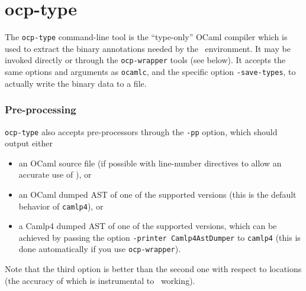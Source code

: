
\section{ocp-type}

The \verb!ocp-type! command-line tool is the ``type-only'' OCaml compiler
which is used to extract the binary annotations needed by the
\typerex\ environment. It may be invoked directly or through the
\verb!ocp-wrapper! tools (see below). It accepts the same options and
arguments as \verb!ocamlc!, and the specific option
\verb!-save-types!, to actually write the binary data to a file.

\subsubsection*{Pre-processing}
\verb!ocp-type! also accepts pre-processors through the \verb!-pp!
option, which should output either
\begin{itemize}
\item an OCaml source file (if possible with line-number directives to
  allow an accurate use of \typerex), or
\item an OCaml dumped AST of one of the supported versions (this is the
  default behavior of \verb!camlp4!), or
\item a Camlp4 dumped AST of one of the supported versions, which can
  be achieved by passing the option \verb!-printer Camlp4AstDumper! to
  \verb!camlp4! (this is done automatically if you use
  \verb!ocp-wrapper!).
\end{itemize}
Note that the third option is better than the second one with respect
to locations (the accuracy of which is instrumental to \typerex\
working).

